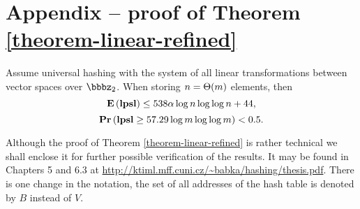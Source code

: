 \section*{Appendix -- proof of Theorem \ref{theorem-linear-refined}}
\setcounter{theorem}{1}

\begin{theorem}
Assume universal hashing with the system of all linear transformations between vector spaces over $\bbbz_2$. When storing $n = \mathrm{\Theta}(m)$ elements, then $$\mathbf{E}\left(\mathbf{lpsl}\right) \leq 538 \alpha \log n \log \log n + 44,$$ $$\mathbf{Pr}\left(\mathbf{lpsl} \geq 57.29 \log m \log \log m\right) < 0.5.$$
\end{theorem}

Although the proof of Theorem \ref{theorem-linear-refined} is rather technical we shall enclose it for further possible verification of the results. It may be found in Chapters 5 and 6.3 at \url{http://ktiml.mff.cuni.cz/~babka/hashing/thesis.pdf}. There is one change in the notation, the set of all addresses of the hash table is denoted by $B$ instead of $V$.